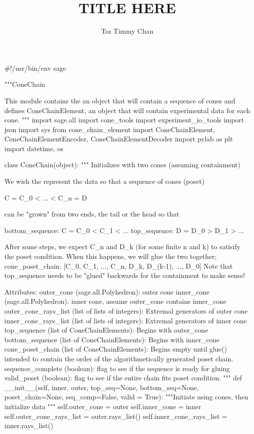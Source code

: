 \documentclass{TC}
\title{TITLE HERE}	%
\author{Tsz Timmy Chan}	%
\begin{document}
\begin{SAGE}
#!/usr/bin/env sage

"""ConeChain

This module contains the an object that will contain a sequence of cones
and defines ConeChainElement, an object that will contain experimental data for each cone.
"""
import sage.all
import cone_tools
import experiment_io_tools
import json 
import sys
from cone_chain_element import ConeChainElement, ConeChainElementEncoder, ConeChainElementDecoder
import pylab as plt
import datetime, os


class ConeChain(object):
	""" Initializes with two cones (assuming containment)
	
	We wish the represent the data so that a sequence of cones (poset)

		C = C_0 < ... < C_n = D

	can be "grown" from two ends, the tail or the head so that

	bottom_sequence: C = C_0 < C_1 < ... 
	top_sequence: D = D_0 > D_1 > ...
	
	After some steps, we expect C_n and D_k (for some finite n and k) 
		to satisify the poset condition. When this happens, we will glue the two together;
	cone_poset_chain: [C_0, C_1, ..., C_n, D_k, D_(k-1), ..., D_0]
		Note that top_sequence needs to be "glued" backwards for the containment to make sense!

	Attributes:
		outer_cone (sage.all.Polyhedron): outer cone
		inner_cone (sage.all.Polyhedron): inner cone, assume outer_cone contains inner_cone
		outer_cone_rays_list (list of lists of integers): Extremal generators of outer cone
		inner_cone_rays_list (list of lists of integers): Extremal generators of inner cone
		top_sequence (list of ConeChainElements): Begins with outer_cone
		bottom_sequence (list of ConeChainElements): Begins with inner_cone
		cone_poset_chain (list of ConeChainElements): Begins empty until glue()
			intended to contain the order of the algorithmetically generated poset chain.
		sequence_complete (boolean): flag to see if the sequence is ready for gluing
		valid_poset (boolean): flag to see if the entire chain fits poset condition. 
	"""
	def __init__(self, inner, outer, 
			top_seq=None, bottom_seq=None,
			poset_chain=None, seq_comp=False, valid = True):
		"""Initiate using cones, then initialize data	"""
		self.outer_cone = outer
		self.inner_cone = inner
		self.outer_cone_rays_list = outer.rays_list()
		self.inner_cone_rays_list = inner.rays_list()
		

\end{SAGE}
\end{document}
